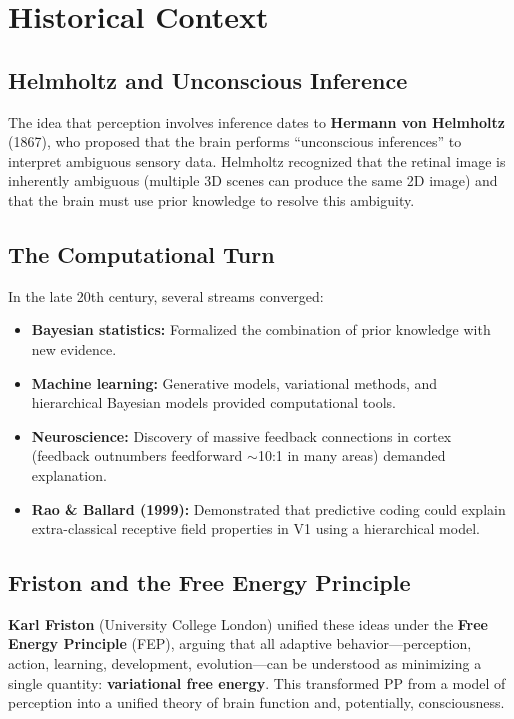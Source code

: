\documentclass[11pt,a4paper]{report}
\begin{document}
\section{Historical Context}

\subsection{Helmholtz and Unconscious Inference}

The idea that perception involves inference dates to \textbf{Hermann von Helmholtz} (1867), who proposed that the brain performs ``unconscious inferences'' to interpret ambiguous sensory data. Helmholtz recognized that the retinal image is inherently ambiguous (multiple 3D scenes can produce the same 2D image) and that the brain must use prior knowledge to resolve this ambiguity.

\subsection{The Computational Turn}

In the late 20th century, several streams converged:
\begin{itemize}[leftmargin=1.5em]
  \item \textbf{Bayesian statistics:} Formalized the combination of prior knowledge with new evidence.
  \item \textbf{Machine learning:} Generative models, variational methods, and hierarchical Bayesian models provided computational tools.
  \item \textbf{Neuroscience:} Discovery of massive feedback connections in cortex (feedback outnumbers feedforward $\sim$10:1 in many areas) demanded explanation.
  \item \textbf{Rao \& Ballard (1999):} Demonstrated that predictive coding could explain extra-classical receptive field properties in V1 using a hierarchical model.
\end{itemize}

\subsection{Friston and the Free Energy Principle}

\textbf{Karl Friston} (University College London) unified these ideas under the \textbf{Free Energy Principle} (FEP), arguing that all adaptive behavior---perception, action, learning, development, evolution---can be understood as minimizing a single quantity: \textbf{variational free energy}. This transformed PP from a model of perception into a unified theory of brain function and, potentially, consciousness.
\end{document}
